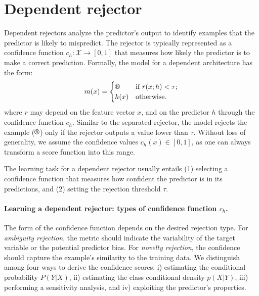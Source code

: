 \section{Dependent rejector}\label{sec:dependent_rejector}
Dependent rejectors analyze the predictor's output to identify examples that the predictor is likely to mispredict. The rejector is typically represented as a confidence function $c_h \colon \mathcal{X} \to [0,1]$ that measures how likely the predictor is to make a correct prediction. Formally, the model for a dependent architecture has the form:
\begin{equation}
m(x) = 
\begin{cases}
\rr{} & \text{if } r(x; h) < \tau; \\
h(x)  & \text{otherwise.}
\end{cases}
\label{eq:dependent_rejector}
\end{equation}
where $r$ may depend on the feature vector $x$, and on the predictor $h$ through the confidence function $c_h$. Similar to the separated rejector, the model rejects the example ($\rr{}$) only if the rejector outputs a value lower than $\tau$. Without loss of generality, we assume the confidence values $c_h(x) \in [0,1]$, as one can always transform a score function into this range.  %

The learning task for a dependent rejector usually entails (1) selecting a confidence function that measures how confident the predictor is in its predictions, and (2) setting the rejection threshold $\tau$. %


\paragraph{\textbf{Learning a dependent rejector: types of confidence function $c_h$.}}
The form of  the confidence function depends on the desired rejection type. For \emph{ambiguity rejection}, the metric should indicate the variability of the target variable or the potential predictor bias. For \emph{novelty rejection}, the confidence should capture the example's similarity to the training data. 
We distinguish among four ways to derive the confidence scores: i) estimating the conditional probability $P(Y|X)$, ii) estimating the class conditional density $p(X|Y)$, iii) performing a sensitivity analysis, and iv) exploiting the predictor's properties.



